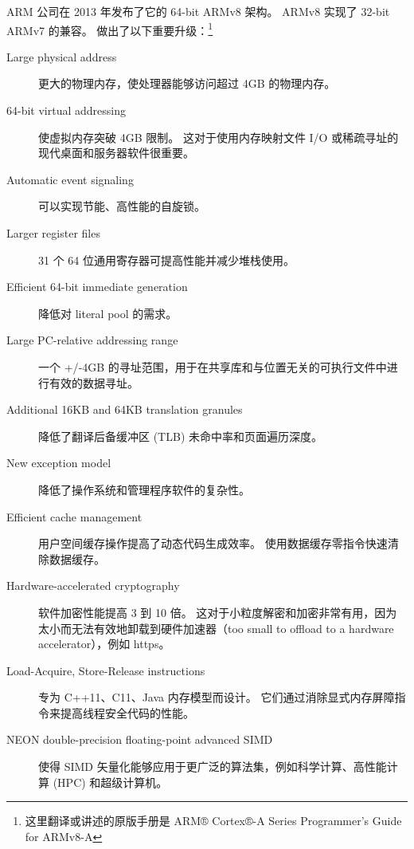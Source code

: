 ARM 公司在 2013 年发布了它的 64-bit ARMv8 架构。
ARMv8 实现了 32-bit ARMv7 的兼容。
做出了以下重要升级：\footnote{
  这里翻译或讲述的原版手册是 {ARM® Cortex®-A Series Programmer’s Guide for ARMv8-A}\cite{armpg}
}

\begin{description}
    \item[Large physical address] 更大的物理内存，使处理器能够访问超过 4GB 的物理内存。
    \item[64-bit virtual addressing] 使虚拟内存突破 4GB 限制。
    这对于使用内存映射文件 I/O 或稀疏寻址的现代桌面和服务器软件很重要。
    \item[Automatic event signaling] 可以实现节能、高性能的自旋锁。
    \item[Larger register files] 31 个 64 位通用寄存器可提高性能并减少堆栈使用。
    \item[Efficient 64-bit immediate generation] 降低对 literal pool 的需求。
    \item[Large PC-relative addressing range] 一个 +/‑4GB 的寻址范围，用于在共享库和与位置无关的可执行文件中进行有效的数据寻址。
    \item[Additional 16KB and 64KB translation granules] 降低了翻译后备缓冲区 (TLB) 未命中率和页面遍历深度。
    \item[New exception model] 降低了操作系统和管理程序软件的复杂性。
    \item[Efficient cache management] 用户空间缓存操作提高了动态代码生成效率。
    使用数据缓存零指令快速清除数据缓存。
    \item[Hardware-accelerated cryptography] 软件加密性能提高 3 到 10 倍。
      这对于小粒度解密和加密非常有用，因为太小而无法有效地卸载到硬件加速器（too small to offload to a hardware accelerator），例如 https。
    \item[Load-Acquire, Store-Release instructions] 专为 C++11、C11、Java 内存模型而设计。
    它们通过消除显式内存屏障指令来提高线程安全代码的性能。
    \item[NEON double-precision floating-point advanced SIMD] 使得 SIMD 矢量化能够应用于更广泛的算法集，例如科学计算、高性能计算 (HPC) 和超级计算机。
\end{description}


















